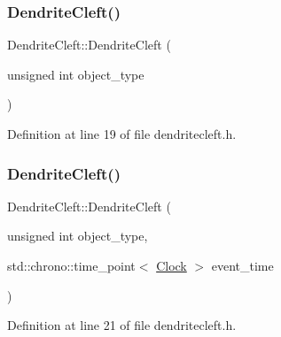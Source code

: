 \subsubsection{\texorpdfstring{Dendrite\+Cleft()}{DendriteCleft()}\hspace{0.1cm}{\footnotesize\ttfamily [2/4]}}
{\footnotesize\ttfamily Dendrite\+Cleft\+::\+Dendrite\+Cleft (\begin{DoxyParamCaption}\item[{unsigned int}]{object\+\_\+type }\end{DoxyParamCaption})\hspace{0.3cm}{\ttfamily [inline]}}



Definition at line 19 of file dendritecleft.\+h.

\mbox{\label{class_dendrite_cleft_ad4070ce743d8302bc120ea948890ea37}} 
\subsubsection{\texorpdfstring{Dendrite\+Cleft()}{DendriteCleft()}\hspace{0.1cm}{\footnotesize\ttfamily [3/4]}}
{\footnotesize\ttfamily Dendrite\+Cleft\+::\+Dendrite\+Cleft (\begin{DoxyParamCaption}\item[{unsigned int}]{object\+\_\+type,  }\item[{std\+::chrono\+::time\+\_\+point$<$ \mbox{\hyperlink{universe_8h_a0ef8d951d1ca5ab3cfaf7ab4c7a6fd80}{Clock}} $>$}]{event\+\_\+time }\end{DoxyParamCaption})\hspace{0.3cm}{\ttfamily [inline]}}



Definition at line 21 of file dendritecleft.\+h.

\mbox{\label{class_dendrite_cleft_abcb81284cd9bd7ee2863eecfb6b59f62}} 
